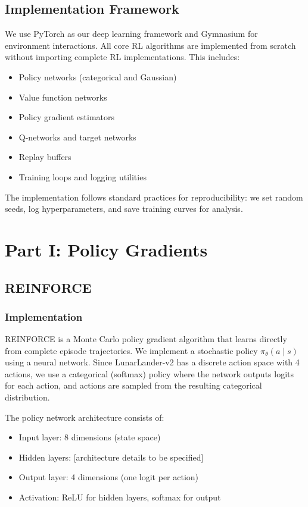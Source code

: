 \documentclass[11pt, a4paper, oneside]{memoir}
\begin{document}
\section{Implementation Framework}

We use PyTorch as our deep learning framework and Gymnasium for environment interactions. All core RL algorithms are implemented from scratch without importing complete RL implementations. This includes:
\begin{itemize}
\item Policy networks (categorical and Gaussian)
\item Value function networks
\item Policy gradient estimators
\item Q-networks and target networks
\item Replay buffers
\item Training loops and logging utilities
\end{itemize}

The implementation follows standard practices for reproducibility: we set random seeds, log hyperparameters, and save training curves for analysis.

\chapter{Part I: Policy Gradients}
\label{ch:part1}

\section{REINFORCE}
\label{sec:reinforce}

\subsection{Implementation}

REINFORCE is a Monte Carlo policy gradient algorithm that learns directly from complete episode trajectories. We implement a stochastic policy $\pi_\theta(a \mid s)$ using a neural network. Since LunarLander-v2 has a discrete action space with 4 actions, we use a categorical (softmax) policy where the network outputs logits for each action, and actions are sampled from the resulting categorical distribution.

The policy network architecture consists of:
\begin{itemize}
\item Input layer: 8 dimensions (state space)
\item Hidden layers: [architecture details to be specified]
\item Output layer: 4 dimensions (one logit per action)
\item Activation: ReLU for hidden layers, softmax for output
\end{itemize}
\end{document}
